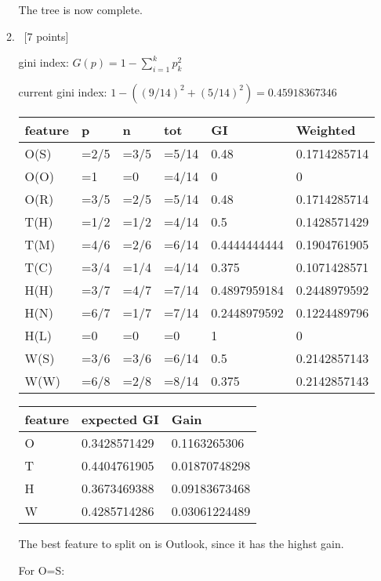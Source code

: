 \documentclass[12pt, fullpage,letterpaper]{article}
\begin{document}
\begin{enumerate}
\begin{enumerate}
		The tree is now complete.
	\item~[7 points] 

	gini index: $G(p)=1-\sum^k_{i=1}p_k^2$

	current gini index: $1-((9/14)^2 + (5/14)^2)=0.45918367346	$

	\begin{tabular}{|l|l|l|l|l|l|}
		\hline
		feature & p    & n    & tot   & GI      & Weighted     \\ \hline
		O(S)    & =2/5 & =3/5 & =5/14 & 0.48         & 0.1714285714 \\ \hline
		O(O)    & =1   & =0   & =4/14 & 0            & 0            \\ \hline
		O(R)    & =3/5 & =2/5 & =5/14 & 0.48         & 0.1714285714 \\ \hline
		T(H)    & =1/2 & =1/2 & =4/14 & 0.5          & 0.1428571429 \\ \hline
		T(M)    & =4/6 & =2/6 & =6/14 & 0.4444444444 & 0.1904761905 \\ \hline
		T(C)    & =3/4 & =1/4 & =4/14 & 0.375        & 0.1071428571 \\ \hline
		H(H)    & =3/7 & =4/7 & =7/14 & 0.4897959184 & 0.2448979592 \\ \hline
		H(N)    & =6/7 & =1/7 & =7/14 & 0.2448979592 & 0.1224489796 \\ \hline
		H(L)    & =0   & =0   & =0    & 1            & 0            \\ \hline
		W(S)    & =3/6 & =3/6 & =6/14 & 0.5          & 0.2142857143 \\ \hline
		W(W)    & =6/8 & =2/8 & =8/14 & 0.375        & 0.2142857143  \\ \hline
		\end{tabular}
	
		\begin{tabular}{|l|l|l|}
			\hline
			feature & expected GI  & Gain          \\ \hline
			O       & 0.3428571429 & 0.1163265306  \\ \hline
			T       & 0.4404761905 & 0.01870748298 \\ \hline
			H       & 0.3673469388 & 0.09183673468 \\ \hline
			W       & 0.4285714286 & 0.03061224489 \\ \hline
			\end{tabular}

The best feature to split on is Outlook, since it has the highst gain. 

For O=S:


\end{enumerate}
\end{enumerate}
\end{document}
